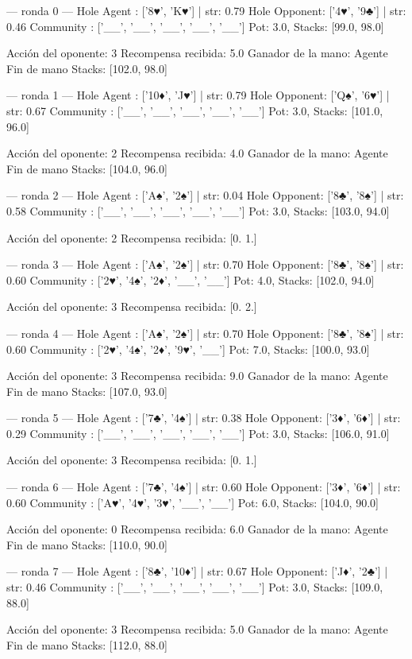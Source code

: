 
--- ronda 0 ---
Hole Agent : ['8♥', 'K♥'] | str: 0.79
Hole Opponent: ['4♥', '9♣'] | str: 0.46
Community  : ['__', '__', '__', '__', '__']
Pot: 3.0, Stacks: [99.0, 98.0]

Acción del oponente: 3
Recompensa recibida: 5.0
Ganador de la mano: Agente
Fin de mano Stacks: [102.0, 98.0]


--- ronda 1 ---
Hole Agent : ['10♦', 'J♥'] | str: 0.79
Hole Opponent: ['Q♠', '6♥'] | str: 0.67
Community  : ['__', '__', '__', '__', '__']
Pot: 3.0, Stacks: [101.0, 96.0]

Acción del oponente: 2
Recompensa recibida: 4.0
Ganador de la mano: Agente
Fin de mano Stacks: [104.0, 96.0]


--- ronda 2 ---
Hole Agent : ['A♠', '2♠'] | str: 0.04
Hole Opponent: ['8♣', '8♠'] | str: 0.58
Community  : ['__', '__', '__', '__', '__']
Pot: 3.0, Stacks: [103.0, 94.0]

Acción del oponente: 2
Recompensa recibida: [0. 1.]

--- ronda 3 ---
Hole Agent : ['A♠', '2♠'] | str: 0.70
Hole Opponent: ['8♣', '8♠'] | str: 0.60
Community  : ['2♥', '4♠', '2♦', '__', '__']
Pot: 4.0, Stacks: [102.0, 94.0]

Acción del oponente: 3
Recompensa recibida: [0. 2.]

--- ronda 4 ---
Hole Agent : ['A♠', '2♠'] | str: 0.70
Hole Opponent: ['8♣', '8♠'] | str: 0.60
Community  : ['2♥', '4♠', '2♦', '9♥', '__']
Pot: 7.0, Stacks: [100.0, 93.0]

Acción del oponente: 3
Recompensa recibida: 9.0
Ganador de la mano: Agente
Fin de mano Stacks: [107.0, 93.0]


--- ronda 5 ---
Hole Agent : ['7♣', '4♠'] | str: 0.38
Hole Opponent: ['3♦', '6♦'] | str: 0.29
Community  : ['__', '__', '__', '__', '__']
Pot: 3.0, Stacks: [106.0, 91.0]

Acción del oponente: 3
Recompensa recibida: [0. 1.]

--- ronda 6 ---
Hole Agent : ['7♣', '4♠'] | str: 0.60
Hole Opponent: ['3♦', '6♦'] | str: 0.60
Community  : ['A♥', '4♥', '3♥', '__', '__']
Pot: 6.0, Stacks: [104.0, 90.0]

Acción del oponente: 0
Recompensa recibida: 6.0
Ganador de la mano: Agente
Fin de mano Stacks: [110.0, 90.0]


--- ronda 7 ---
Hole Agent : ['8♣', '10♦'] | str: 0.67
Hole Opponent: ['J♦', '2♣'] | str: 0.46
Community  : ['__', '__', '__', '__', '__']
Pot: 3.0, Stacks: [109.0, 88.0]

Acción del oponente: 3
Recompensa recibida: 5.0
Ganador de la mano: Agente
Fin de mano Stacks: [112.0, 88.0]


